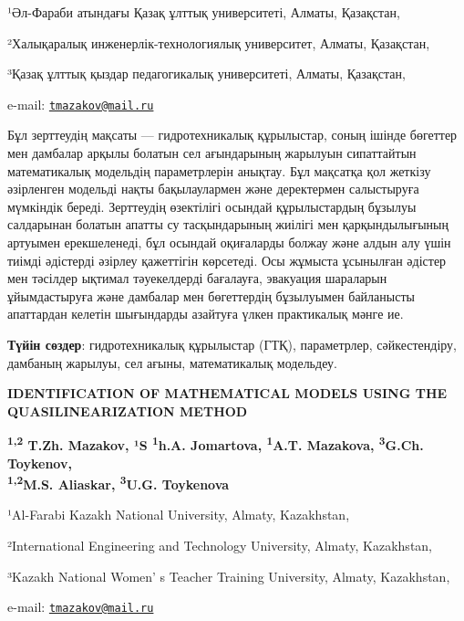 \begin{affiliation}
¹Әл-Фараби атындағы Қазақ ұлттық университеті, Алматы, Қазақстан,

²Халықаралық инженерлік-технологиялық университет, Алматы, Қазақстан,

³Қазақ ұлттық қыздар педагогикалық университеті, Алматы, Қазақстан,

e-mail: \href{mailto:tmazakov@mail.ru}{\nolinkurl{tmazakov@mail.ru}}
\end{affiliation}

Бұл зерттеудің мақсаты --- гидротехникалық құрылыстар, соның ішінде
бөгеттер мен дамбалар арқылы болатын сел ағындарының жарылуын
сипаттайтын математикалық модельдің параметрлерін анықтау. Бұл мақсатқа
қол жеткізу әзірленген модельді нақты бақылаулармен және деректермен
салыстыруға мүмкіндік береді. Зерттеудің өзектілігі осындай
құрылыстардың бұзылуы салдарынан болатын апатты су тасқындарының жиілігі
мен қарқындылығының артуымен ерекшеленеді, бұл осындай оқиғаларды болжау
және алдын алу үшін тиімді әдістерді әзірлеу қажеттігін көрсетеді. Осы
жұмыста ұсынылған әдістер мен тәсілдер ықтимал тәуекелдерді бағалауға,
эвакуация шараларын ұйымдастыруға және дамбалар мен бөгеттердің
бұзылуымен байланысты апаттардан келетін шығындарды азайтуға үлкен
практикалық мәнге ие.

{\bfseries Түйін сөздер}: гидротехникалық құрылыстар (ГТҚ), параметрлер,
сәйкестендіру, дамбаның жарылуы, сел ағыны, математикалық модельдеу.

\begin{articleheader}
{\bfseries IDENTIFICATION OF MATHEMATICAL MODELS USING THE
QUASILINEARIZATION METHOD}

{\bfseries \textsuperscript{1,2} T.Zh. Mazakov\textsuperscript{\envelope }, ¹S
\textsuperscript{1}h.A. Jomartova, \textsuperscript{1}A.T. Mazakova,
\textsuperscript{3}G.Ch. Toykenov,\\
\textsuperscript{1,2}M.S. Aliaskar, \textsuperscript{3}U.G. Toykenova}
\end{articleheader}

\begin{affiliation}
¹Al-Farabi Kazakh National University, Almaty, Kazakhstan,

²International Engineering and Technology University, Almaty, Kazakhstan,

³Kazakh National Women' s Teacher Training University, Almaty, Kazakhstan,

e-mail: \href{mailto:tmazakov@mail.ru}{\nolinkurl{tmazakov@mail.ru}}
\end{affiliation}

